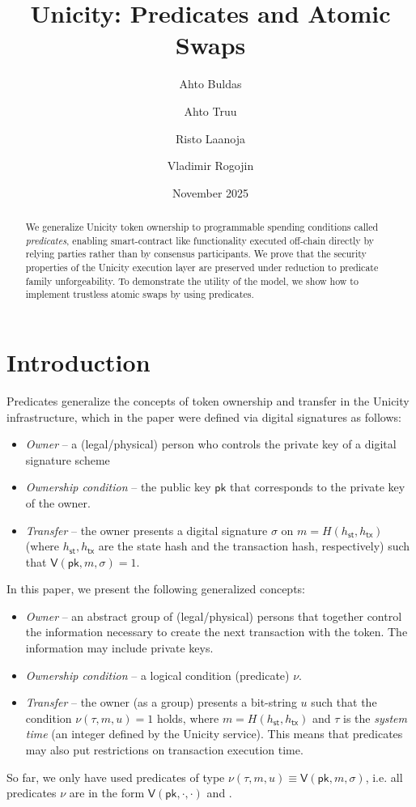 \documentclass{article}
\title{{Unicity: Predicates and Atomic Swaps}}
\author{Ahto Buldas \and Ahto Truu \and Risto Laanoja \and Vladimir Rogojin}
\date{November 2025}
\newcommand{\sigver}[0]{\mathsf{V}}
\newcommand{\pubkey}[0]{\mathsf{pk}}
\newcommand{\sthash}[0]{h_\mathsf{st}}
\newcommand{\txhash}[0]{h_\mathsf{tx}}
\newcommand{\predi}[0]{\nu}
\newcommand{\systime}[0]{\tau}
\begin{document}
\maketitle

\begin{abstract}
We generalize Unicity token ownership to programmable spending conditions called \emph{predicates}, enabling smart-contract like functionality executed off-chain directly by relying parties rather than by consensus participants. We prove that the security properties of the Unicity execution layer are preserved under reduction to predicate family unforgeability. To demonstrate the utility of the model, we show how to implement trustless atomic swaps by using predicates.
\end{abstract}

\section{Introduction}

Predicates generalize the concepts of token ownership and transfer in the Unicity infrastructure, which in
the paper \cite{BTLR25}
were defined via digital signatures as follows:
\begin{itemize}
\item \emph{Owner} -- a (legal/physical) person who controls the private key of a digital signature scheme
\item \emph{Ownership condition} -- the public key $\pubkey$ that corresponds to the private key of the owner.
\item \emph{Transfer} -- the owner presents a digital signature $\sigma$ on $m=H(\sthash,\txhash)$ (where $\sthash,\txhash$ are the state hash and the transaction hash, respectively) such that $\sigver(\pubkey,m,\sigma)=1$.
\end{itemize}
In this paper, we present the following generalized concepts:
\begin{itemize}
\item \emph{Owner} -- an abstract group of (legal/physical) persons that together control the information necessary to create the next transaction with the token. The information may include private keys.
\item \emph{Ownership condition} -- a logical condition (predicate) $\predi$.
\item \emph{Transfer} -- the owner (as a group) presents a bit-string $u$ such that the condition $\predi(\systime, m,u)=1$ holds, where
$m=H(\sthash,\txhash)$ and $\systime$ is the \emph{system time} (an integer defined by the Unicity service). This means that predicates may also put restrictions on transaction execution time.
\end{itemize}
So far, we only have used predicates of type $\predi(\tau,m,u)\equiv \sigver(\pubkey,m,\sigma)$, i.e.
all predicates $\predi$ are in the form $\sigver(\pubkey,\cdot,\cdot)$ and .
\end{document}
